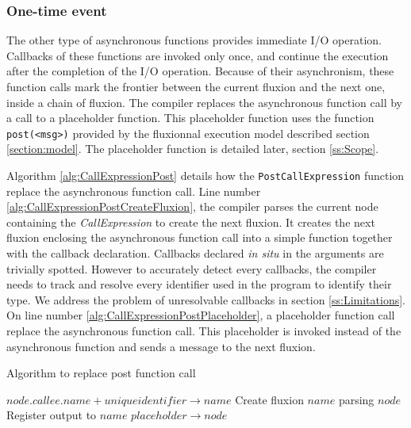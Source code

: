 \subsubsection{One-time event} \label{sss:post}

The other type of asynchronous functions provides immediate I/O operation.
Callbacks of these functions are invoked only once, and continue the execution after the completion of the I/O operation.
Because of their asynchronism, these function calls mark the frontier between the current fluxion and the next one, inside a chain of fluxion.
The compiler replaces the asynchronous function call by a call to a placeholder function.
This placeholder function uses the function \texttt{post(<msg>)} provided by the fluxionnal execution model described section \ref{section:model}.
The placeholder function is detailed later, section \ref{ss:Scope}.

Algorithm \ref{alg:CallExpressionPost} details how the \texttt{PostCallExpression} function replace the asynchronous function call.
Line number \ref{alg:CallExpressionPostCreateFluxion}, the compiler parses the current node containing the \textit{CallExpression} to create the next fluxion.
It creates the next fluxion enclosing the asynchronous function call into a simple function together with the callback declaration.
Callbacks declared \textit{in situ} in the arguments are trivially spotted.
However to accurately detect every callbacks, the compiler needs to track and resolve every identifier used in the program to identify their type.
We address the problem of unresolvable callbacks in section \ref{ss:Limitations}.
On line number \ref{alg:CallExpressionPostPlaceholder}, a placeholder function call replace the asynchronous function call.
This placeholder is invoked instead of the asynchronous function and sends a message to the next fluxion.

\begin{algorithm}
\caption{Algorithm to replace post function call}
\label{alg:CallExpressionPost}
\begin{algorithmic}[1]
\State $node.callee.name + unique identifier \to name$
\State Create fluxion $name$ parsing $node$ \label{alg:CallExpressionPostCreateFluxion}
\State Register output to $name$
\State $placeholder \to node$ \label{alg:CallExpressionPostPlaceholder}
\EndIf
\EndFunction
\end{algorithmic}
\end{algorithm}

